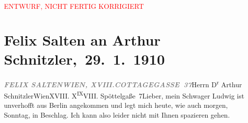 
\begin{center}
            \textcolor{red}{ENTWURF, NICHT FERTIG KORRIGIERT}
                      \end{center}
            
         
         \renewcommand{\erwaehntePersonen}{Personen: Alfred von Berger, Ludwig Metzl, Ottilie Salten}
         \renewcommand{\erwaehnteInstitutionen}{Institutionen: Burgtheater}
         \renewcommand{\erwaehnteOrte}{Orte: Berlin, Cottagegasse, Edmund-Weiß-Gasse 7, Wien, XVIII., Währing}
         \renewcommand{\erwaehnteWerke}{Werke: Der junge Medardus. Dramatische Historie in einem Vorspiel und fünf Aufzügen}
               \section[ Felix Salten an Arthur Schnitzler, 29. 1. 1910]{ Felix Salten an Arthur Schnitzler, 29. 1. 1910}\nopagebreak{}\rehead{ }\begin{ledgroupsized}[t]{13cm}\normalsize\beginnumbering \toendnotes[C]{\smallbreak\pagebreak[2]} 
\toendnotes[C]{\smallbreak}\pstart{}{\pb}\textcolor{gray}{\textbf{\textit{FELIX SALTEN}}}\pend{}\pstart{}\textcolor{gray}{\textbf{\textit{WIEN, XVIII.}}}\pend{}\pstart{}\textcolor{gray}{\textbf{\textit{COTTAGEGASSE 37}}}\pend{}{\bigskip}\pstart{}Herrn D\textsuperscript{r} Arthur Schnitzler\pend{}\pstart{}Wien\pend{}\pstart{}XVIII. X\substVorne{}\textsuperscript{IX}\substDazwischen{}VI\substHinten{}II. Spöttelgaße 7\pend{}{\bigskip}\pstart{}{\pb}Lieber,\pend\pstart
           mein Schwager Ludwig ist unverhofft aus Berlin angekommen und legt mich heute, wie auch morgen,
                  Sonntag, in Beschlag. Ich kann also leider nicht mit Ihnen spazieren gehen.

\end{ledgroupsized}
